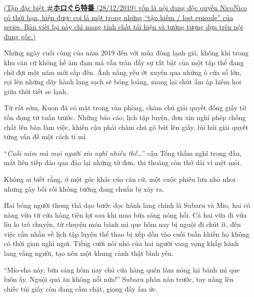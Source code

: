 \documentclass[../main.tex]{subfiles}
\begin{document}

\begin{center}
  \uline{(Tập đặc biệt \textbf{\#ホロぐら特番} (28/12/2019) vốn là nội dung độc quyền NicoNico có thời hạn, hiện được coi là một trong những ``tập hiếm / lost episode'' của series. Bản viết lại này chỉ mang tính chất tái hiện và tưởng tượng dựa trên nội dung gốc.)}
\end{center}

Những ngày cuối cùng của năm 2019 đến với mùa đông lạnh giá, không khí trong khu căn cứ không hề ảm đạm mà vẫn tràn đầy sự tất bật của một tập thể đang chờ đợi một năm mới sắp đến. Ánh nắng yếu ớt xuyên qua những ô cửa sổ lớn, rọi lên những dãy hành lang sạch sẽ bóng loáng, mang lại chút ấm áp hiếm hoi giữa thời tiết se lạnh.

Từ rất sớm, Kuon đã có mặt trong văn phòng, chăm chú giải quyết đống giấy tờ tồn đọng từ tuần trước. Những báo cáo, lịch tập luyện, đơn xin nghỉ phép chồng chất lên bàn làm việc, khiến cậu phải chăm chú gõ bút lên giấy, lúi húi giải quyết từng vấn đề một cách tỉ mỉ.

``\textit{Cuối năm mà mọi người xin nghỉ nhiều thế\dots}'' cậu Tổng thầm nghĩ trong đầu, mắt liên tiếp đảo qua đảo lại những tờ đơn, thi thoảng còn thở dài vì mệt mỏi.

Không ai biết rằng, ở một góc khác của căn cứ, một cuộc phiêu lưu nhỏ nhoi nhưng gây bối rối không tưởng đang chuẩn bị xảy ra.

Hai bóng người thong thả dạo bước dọc hành lang chính là Subaru và Mio, hai cô nàng vừa từ cửa hàng tiện lợi sau khi mua bữa sáng nóng hổi. Cả hai vừa đi vừa líu lo trò chuyện, từ chuyện món bánh mì que hôm nay bị nguội đi chút ít, đến việc cằn nhằn về lịch tập luyện thể thao bị xếp dồn vào cuối tuần khiến họ không có thời gian nghỉ ngơi. Tiếng cười nói nhỏ của hai người vang vọng khắp hành lang vắng người, tạo nên một khung cảnh thật bình yên.

``Mio-sha này, bữa sáng hôm nay chủ cửa hàng quên làm nóng lại bánh mì que luôn ấy. Nguội quá ăn không nổi nữa!'' Subaru phàn nàn trước, tay nâng lên chiếc túi giấy còn đang cầm chặt, giọng đầy ấm ức.
\end{document}
